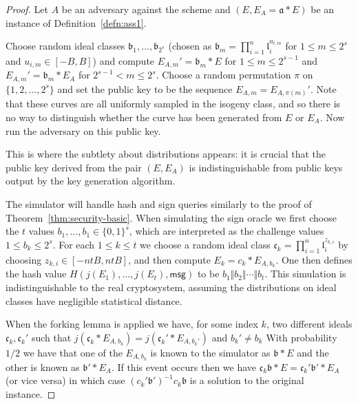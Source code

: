 \documentclass{llncs}
\newcommand{\msg}{\textsf{msg}}
\renewcommand{\a}{\mathfrak{a}}
\renewcommand{\b}{\mathfrak{b}}
\renewcommand{\c}{\mathfrak{c}}
\renewcommand{\l}{\mathfrak{l}}
\begin{document}
\begin{proof}
Let $A$ be an adversary against the scheme and $(E, E_A = \a * E )$ be an instance of Definition~\ref{defn:ass1}.

Choose random ideal classes $\b_1, \dots, \b_{2^s}$
(chosen as $\b_m = \prod_{i=1}^n \l_i^{u_{i,m}}$ for $1 \le m \le 2^s$ and $u_{i,m} \in [-B,B]$)
and compute $E_{A,m}' = \b_m * E$ for $1 \le m \le 2^{s-1}$ and $E_{A,m}' = \b_m * E_A$ for $2^{s-1} < m \le 2^s$. Choose a random permutation $\pi$ on $\{ 1, 2, \dots, 2^s \}$ and set the public key to be the sequence $E_{A,m} = E_{A,\pi(m)}'$.
Note that these curves are all uniformly sampled in the isogeny class, and so there is no way to distinguish whether the curve has been generated from $E$ or $E_A$.
Now run the adversary on this public key.

This is where the subtlety about distributions appears: it is crucial that the public key derived from the pair $(E, E_A)$ is indistinguishable from public keys output by the key generation algorithm.


The simulator will handle hash and sign queries similarly to the proof of Theorem~\ref{thm:security-basic}.
When simulating the sign oracle we first choose the $t$ values $b_1, \dots, b_1 \in \{0,1\}^s$, which are interpreted as the challenge values $1 \le b_k \le 2^s$.
For each $1 \le k \le t$ we choose a random ideal class $\c_k = \prod_{i=1}^n \l_i^{z_{k,i}}$ by choosing $z_{k,i} \in [-ntB, ntB]$, and then compute $E_k = c_k * E_{A,b_k}$.
One then defines the hash value $H( j(E_1), \dots, j(E_t), \msg )$ to be $b_1 \Vert b_2 \Vert \cdots \Vert b_t$.
This simulation is indistinguishable to the real cryptosystem, assuming the distributions on ideal classes have negligible statistical distance.

When the forking lemma is applied we have, for some index $k$, two different ideals $\c_k, \c_k'$ such that $j( \c_k * E_{A, b_k} ) = j( \c_k' * E_{A, b_k'})$ and $b_k' \ne b_k$
With probability $1/2$ we have that one of the $E_{A,b_k}$ is known to the simulator as  $\b * E$ and the other is known as $\b' * E_A$. If this event occurs then we have $\c_k \b * E = \c_k' \b' * E_A$ (or vice versa) in which case $(c_k' \b')^{-1} c_k \b$ is a solution to the original instance.
\end{proof}


\end{document}
